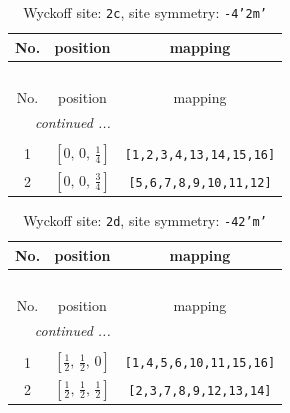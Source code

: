 \documentclass[fleqn,8pt]{jsarticle}
\begin{document}
\renewcommand{\arraystretch}{1.2}
\begin{longtable}{ccc}
\caption{Wyckoff site: {\tt 2c}, site symmetry: {\tt -4'2m'}}
 \\
 \hline \hline
No. & position & mapping \\ \hline \endfirsthead

\multicolumn{2}{l}{\tablename\ \thetable{}} \\
 \hline \hline
No. & position & mapping \\ \hline \endhead

 \hline \hline
\multicolumn{2}{r}{\footnotesize\it continued ...} \\ \endfoot

 \hline \hline
\multicolumn{2}{r}{} \\ \endlastfoot

1 & $\left[ 0,\, 0,\, \frac{1}{4} \right]$ & {\tt [1,2,3,4,13,14,15,16]} \\ \hline
2 & $\left[ 0,\, 0,\, \frac{3}{4} \right]$ & {\tt [5,6,7,8,9,10,11,12]} \\
\end{longtable}
\renewcommand{\arraystretch}{1.2}
\begin{longtable}{ccc}
\caption{Wyckoff site: {\tt 2d}, site symmetry: {\tt -42'm'}}
 \\
 \hline \hline
No. & position & mapping \\ \hline \endfirsthead

\multicolumn{2}{l}{\tablename\ \thetable{}} \\
 \hline \hline
No. & position & mapping \\ \hline \endhead

 \hline \hline
\multicolumn{2}{r}{\footnotesize\it continued ...} \\ \endfoot

 \hline \hline
\multicolumn{2}{r}{} \\ \endlastfoot

1 & $\left[ \frac{1}{2},\, \frac{1}{2},\, 0 \right]$ & {\tt [1,4,5,6,10,11,15,16]} \\ \hline
2 & $\left[ \frac{1}{2},\, \frac{1}{2},\, \frac{1}{2} \right]$ & {\tt [2,3,7,8,9,12,13,14]} \\
\end{longtable}
\renewcommand{\arraystretch}{1.2}
\end{document}
